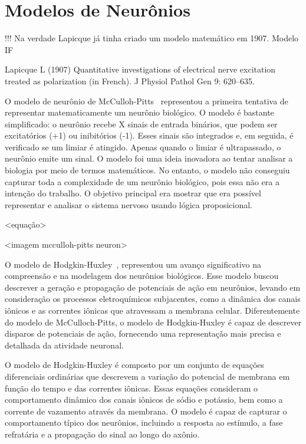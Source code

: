 \section{Modelos de Neurônios}

!!! Na verdade Lapicque já tinha criado um modelo matemático em 1907. Modelo IF

Lapicque L (1907) Quantitative investigations of electrical
nerve excitation treated as polarization (in French). J
Physiol Pathol Gen 9: 620–635.

O modelo de neurônio de McCulloh-Pitts~\cite{mccullochLogical1943} representou a primeira tentativa de representar matematicamente
um neurônio biológico. O modelo é bastante simplificado: o neurônio recebe X sinais de entrada binários, que podem ser
excitatórios (+1) ou inibitórios (-1). Esses sinais são integrados e, em seguida, é verificado se um limiar é atingido. Apenas
quando o limiar é ultrapassado, o neurônio emite um sinal. O modelo foi uma ideia inovadora ao tentar analisar a biologia por meio
de termos matemáticos. No entanto, o modelo não conseguiu capturar toda a complexidade de um neurônio biológico, pois essa não era
a intenção do trabalho. O objetivo principal era mostrar que era possível representar e analisar o sistema nervoso usando lógica
proposicional.

<equação>

<imagem mcculloh-pitts neuron>

O modelo de Hodgkin-Huxley~\cite{hodgkinQuantitative1952}, representou um avanço significativo na compreensão e na modelagem dos
neurônios biológicos. Esse modelo buscou descrever a geração e propagação de potenciais de ação em neurônios, levando em
consideração os processos eletroquímicos subjacentes, como a dinâmica dos canais iônicos e as correntes iônicas que atravessam a
membrana celular. Diferentemente do modelo de McCulloch-Pitts, o modelo de Hodgkin-Huxley é capaz de descrever disparos de
potenciais de ação, fornecendo uma representação mais precisa e detalhada da atividade neuronal.

O modelo de Hodgkin-Huxley é composto por um conjunto de equações diferenciais ordinárias que descrevem a variação do potencial de
membrana em função do tempo e das correntes iônicas. Essas equações consideram o comportamento dinâmico dos canais iônicos de
sódio e potássio, bem como a corrente de vazamento através da membrana. O modelo é capaz de capturar o comportamento típico dos
neurônios, incluindo a resposta ao estímulo, a fase refratária e a propagação do sinal ao longo do axônio.

